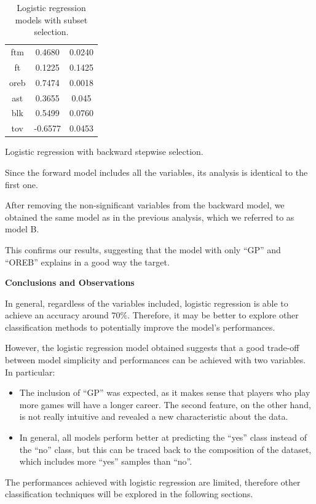 \begin{table}[h]
\begin{subtable}[h]{0.4\textwidth}
\begin{tabular}{||c | c | c ||}
			ftm & 0.4680 & 0.0240 \\
			ft & 0.1225 & 0.1425 \\
			oreb & 0.7474 & 0.0018 \\
			ast & 0.3655 & 0.045 \\
			blk & 0.5499 & 0.0760 \\				
			tov & -0.6577 & 0.0453 \\
			\hline
		\end{tabular}
		\caption{Logistic regression with backward stepwise selection.}
		\label{table:LRBSSum}
	\end{subtable}
	\caption{Logistic regression models with subset selection.}
	\label{table:LRSSum}
\end{table}

Since the forward model includes all the variables, its analysis is identical to the first one.

After removing the non-significant variables from the backward model, we obtained the same model as in the previous analysis, which we referred to as model B. 

This confirms our results, suggesting that the model with only ``GP'' and ``OREB'' explains in a good way the target. 

\vspace{0.2cm}
\textbf{Conclusions and Observations}

In general, regardless of the variables included, logistic regression is able to achieve an accuracy around $70\%$. Therefore, it may be better to explore other classification methods to potentially improve the model's performances.

However, the logistic regression model obtained suggests that a good trade-off between model simplicity and performances can be achieved with two variables. In particular:

\begin{itemize}
	\item The inclusion of ``GP'' was expected, as it makes sense that players who play more games will have a longer career. The second feature, on the other hand, is not really intuitive and revealed a new characteristic about the data.
	\item In general, all models perform better at predicting the ``yes'' class instead of the ``no'' class, but this can be traced back to the composition of the dataset, which includes more ``yes'' samples than ``no''.
\end{itemize}

The performances achieved with logistic regression are limited, therefore other classification techniques will be explored in the following sections.
